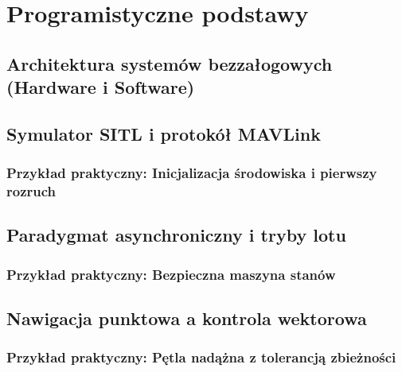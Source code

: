\chapter{Programistyczne podstawy}
\section{Architektura systemów bezzałogowych (Hardware i Software)}

\section{Symulator SITL i protokół MAVLink}
\subsection{Przykład praktyczny: Inicjalizacja środowiska i pierwszy rozruch}

\section{Paradygmat asynchroniczny i tryby lotu}
\subsection{Przykład praktyczny: Bezpieczna maszyna stanów}

\section{Nawigacja punktowa a kontrola wektorowa}
\subsection{Przykład praktyczny: Pętla nadążna z tolerancją zbieżności}

